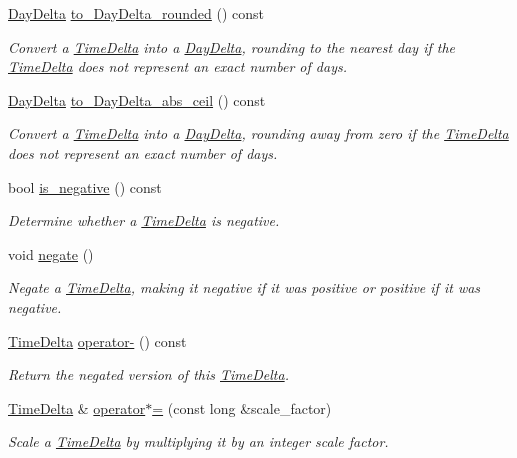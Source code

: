 \begin{DoxyCompactItemize}
\hyperlink{structDayDelta}{Day\-Delta} \hyperlink{structTimeDelta_ad4f0f7a7eb10b5c59e54faff404453e4}{to\-\_\-\-Day\-Delta\-\_\-rounded} () const 
\begin{DoxyCompactList}\small\item\em Convert a \hyperlink{structTimeDelta}{Time\-Delta} into a \hyperlink{structDayDelta}{Day\-Delta}, rounding to the nearest day if the \hyperlink{structTimeDelta}{Time\-Delta} does not represent an exact number of days. \end{DoxyCompactList}\item 
\hyperlink{structDayDelta}{Day\-Delta} \hyperlink{structTimeDelta_a7febe32ac5264cc90c672bd65e316187}{to\-\_\-\-Day\-Delta\-\_\-abs\-\_\-ceil} () const 
\begin{DoxyCompactList}\small\item\em Convert a \hyperlink{structTimeDelta}{Time\-Delta} into a \hyperlink{structDayDelta}{Day\-Delta}, rounding away from zero if the \hyperlink{structTimeDelta}{Time\-Delta} does not represent an exact number of days. \end{DoxyCompactList}\item 
bool \hyperlink{structTimeDelta_acc2faf0e9a1563c84fb68cad42521c54}{is\-\_\-negative} () const 
\begin{DoxyCompactList}\small\item\em Determine whether a \hyperlink{structTimeDelta}{Time\-Delta} is negative. \end{DoxyCompactList}\item 
void \hyperlink{structTimeDelta_a858c8d0eae6070a24ba7fd3e18a3cf3f}{negate} ()
\begin{DoxyCompactList}\small\item\em Negate a \hyperlink{structTimeDelta}{Time\-Delta}, making it negative if it was positive or positive if it was negative. \end{DoxyCompactList}\item 
\hyperlink{structTimeDelta}{Time\-Delta} \hyperlink{structTimeDelta_a660df6f5ba7291bef24d5a05639563b6}{operator-\/} () const 
\begin{DoxyCompactList}\small\item\em Return the negated version of this \hyperlink{structTimeDelta}{Time\-Delta}. \end{DoxyCompactList}\item 
\hyperlink{structTimeDelta}{Time\-Delta} \& \hyperlink{structTimeDelta_a96e1fc7a392f36a35669fce0f2d3ab14}{operator$\ast$=} (const long \&scale\-\_\-factor)
\begin{DoxyCompactList}\small\item\em Scale a \hyperlink{structTimeDelta}{Time\-Delta} by multiplying it by an integer scale factor. \end{DoxyCompactList}\item 

\end{DoxyCompactItemize}
